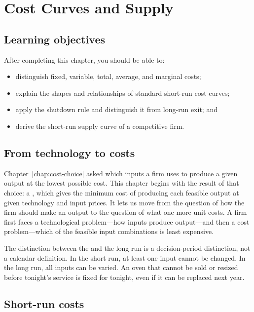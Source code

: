 \chapter{Cost Curves and Supply}
\label{chap:cost-curves}

\section{Learning objectives}

After completing this chapter, you should be able to:
\begin{itemize}
  \item distinguish fixed, variable, total, average, and marginal costs;
  \item explain the shapes and relationships of standard short-run cost curves;
  \item apply the shutdown rule and distinguish it from long-run exit; and
  \item derive the short-run supply curve of a competitive firm.
\end{itemize}

\section{From technology to costs}

Chapter~\ref{chap:cost-choice} asked which inputs a firm uses to produce a
given output at the lowest possible cost. This chapter begins with the result
of that choice: a , which gives the minimum cost of
producing each feasible output at given technology and input prices. It lets
us move from the question of how the firm should make an output to the question
of what one more unit costs. A firm first faces a technological
problem---how inputs produce output---and then a cost problem---which of the
feasible input combinations is least expensive.

The distinction between the  and the long run is a
decision-period distinction, not a calendar definition. In the short run, at
least one input cannot be changed. In the long run, all inputs can be varied.
An oven that cannot be sold or resized before tonight's service is fixed for
tonight, even if it can be replaced next year.

\section{Short-run costs}

